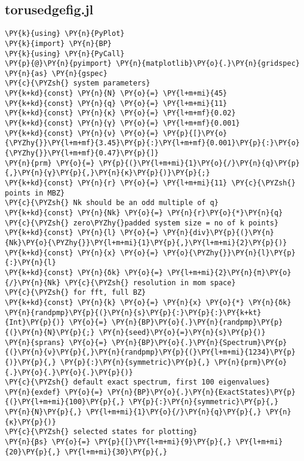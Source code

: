 \subsection{torus\textunderscore edge\textunderscore fig.jl}\label{subsec:torus-edge}
\begin{Verbatim}[commandchars=\\\{\}]
\PY{k}{using} \PY{n}{PyPlot}
\PY{k}{import} \PY{n}{BP}
\PY{k}{using} \PY{n}{PyCall}
\PY{p}{@}\PY{n}{pyimport} \PY{n}{matplotlib}\PY{o}{.}\PY{n}{gridspec} \PY{n}{as} \PY{n}{gspec}
\PY{c}{\PYZsh{} system parameters}
\PY{k+kd}{const} \PY{n}{N} \PY{o}{=} \PY{l+m+mi}{45}
\PY{k+kd}{const} \PY{n}{q} \PY{o}{=} \PY{l+m+mi}{11}
\PY{k+kd}{const} \PY{n}{κ} \PY{o}{=} \PY{l+m+mf}{0.02}
\PY{k+kd}{const} \PY{n}{γ} \PY{o}{=} \PY{l+m+mf}{0.001}
\PY{k+kd}{const} \PY{n}{ν} \PY{o}{=} \PY{p}{[}\PY{o}{\PYZhy{}}\PY{l+m+mf}{3.45}\PY{p}{:}\PY{l+m+mf}{0.001}\PY{p}{:}\PY{o}{\PYZhy{}}\PY{l+m+mf}{0.47}\PY{p}{]}
\PY{n}{prm} \PY{o}{=} \PY{p}{(}\PY{l+m+mi}{1}\PY{o}{/}\PY{n}{q}\PY{p}{,}\PY{n}{γ}\PY{p}{,}\PY{n}{κ}\PY{p}{)}\PY{p}{;}
\PY{k+kd}{const} \PY{n}{r} \PY{o}{=} \PY{l+m+mi}{11} \PY{c}{\PYZsh{} points in MBZ}
\PY{c}{\PYZsh{} Nk should be an odd multiple of q}
\PY{k+kd}{const} \PY{n}{Nk} \PY{o}{=} \PY{n}{r}\PY{o}{*}\PY{n}{q} \PY{c}{\PYZsh{} zero\PYZhy{}padded system size = no of k points}
\PY{k+kd}{const} \PY{n}{l} \PY{o}{=} \PY{n}{div}\PY{p}{(}\PY{n}{Nk}\PY{o}{\PYZhy{}}\PY{l+m+mi}{1}\PY{p}{,}\PY{l+m+mi}{2}\PY{p}{)}
\PY{k+kd}{const} \PY{n}{x} \PY{o}{=} \PY{o}{\PYZhy{}}\PY{n}{l}\PY{p}{:}\PY{n}{l}
\PY{k+kd}{const} \PY{n}{δk} \PY{o}{=} \PY{l+m+mi}{2}\PY{n}{π}\PY{o}{/}\PY{n}{Nk} \PY{c}{\PYZsh{} resolution in mom space}
\PY{c}{\PYZsh{} for fft, full BZ}
\PY{k+kd}{const} \PY{n}{k} \PY{o}{=} \PY{n}{x} \PY{o}{*} \PY{n}{δk}
\PY{n}{randpmp}\PY{p}{(}\PY{n}{s}\PY{p}{:}\PY{p}{:}\PY{k+kt}{Int}\PY{p}{)} \PY{o}{=} \PY{n}{BP}\PY{o}{.}\PY{n}{randpmp}\PY{p}{(}\PY{n}{N}\PY{p}{;} \PY{n}{seed}\PY{o}{=}\PY{n}{s}\PY{p}{)}
\PY{n}{sprans} \PY{o}{=} \PY{n}{BP}\PY{o}{.}\PY{n}{Spectrum}\PY{p}{(}\PY{n}{ν}\PY{p}{,}\PY{n}{randpmp}\PY{p}{(}\PY{l+m+mi}{1234}\PY{p}{)}\PY{p}{,} \PY{p}{:}\PY{n}{symmetric}\PY{p}{,} \PY{n}{prm}\PY{o}{.}\PY{o}{.}\PY{o}{.}\PY{p}{)}
\PY{c}{\PYZsh{} default exact spectrum, first 100 eigenvalues}
\PY{n}{exdef} \PY{o}{=} \PY{n}{BP}\PY{o}{.}\PY{n}{ExactStates}\PY{p}{(}\PY{l+m+mi}{100}\PY{p}{,} \PY{p}{:}\PY{n}{symmetric}\PY{p}{,} \PY{n}{N}\PY{p}{,} \PY{l+m+mi}{1}\PY{o}{/}\PY{n}{q}\PY{p}{,} \PY{n}{κ}\PY{p}{)}
\PY{c}{\PYZsh{} selected states for plotting}
\PY{n}{βs} \PY{o}{=} \PY{p}{[}\PY{l+m+mi}{9}\PY{p}{,} \PY{l+m+mi}{20}\PY{p}{,} \PY{l+m+mi}{30}\PY{p}{,}

\end{Verbatim}
